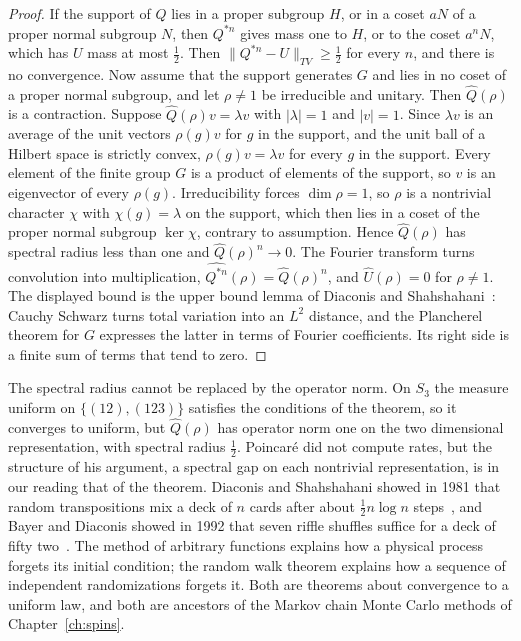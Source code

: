 \begin{proof}
If the support of $Q$ lies in a proper subgroup $H$, or in a coset $aN$ of a proper normal subgroup $N$, then $Q^{*n}$ gives mass one to $H$, or to the coset $a^nN$, which has $U$ mass at most $\frac12$. Then $\|Q^{*n}-U\|_{TV}\geq\frac12$ for every $n$, and there is no convergence. Now assume that the support generates $G$ and lies in no coset of a proper normal subgroup, and let $\rho\neq1$ be irreducible and unitary. Then $\hat Q(\rho)$ is a contraction. Suppose $\hat Q(\rho)v = \lambda v$ with $|\lambda| = 1$ and $|v| = 1$. Since $\lambda v$ is an average of the unit vectors $\rho(g)v$ for $g$ in the support, and the unit ball of a Hilbert space is strictly convex, $\rho(g)v = \lambda v$ for every $g$ in the support. Every element of the finite group $G$ is a product of elements of the support, so $v$ is an eigenvector of every $\rho(g)$. Irreducibility forces $\dim\rho = 1$, so $\rho$ is a nontrivial character $\chi$ with $\chi(g) = \lambda$ on the support, which then lies in a coset of the proper normal subgroup $\ker\chi$, contrary to assumption. Hence $\hat Q(\rho)$ has spectral radius less than one and $\hat Q(\rho)^n\to0$. The Fourier transform turns convolution into multiplication, $\widehat{Q^{*n}}(\rho) = \hat Q(\rho)^n$, and $\hat U(\rho) = 0$ for $\rho\neq1$. The displayed bound is the upper bound lemma of Diaconis and Shahshahani~\cite{diaconisshahshahani1981,diaconis1988}: Cauchy Schwarz turns total variation into an $L^2$ distance, and the Plancherel theorem for $G$ expresses the latter in terms of Fourier coefficients. Its right side is a finite sum of terms that tend to zero.
\end{proof}

The spectral radius cannot be replaced by the operator norm. On $S_3$ the measure uniform on $\{(12),(123)\}$ satisfies the conditions of the theorem, so it converges to uniform, but $\hat Q(\rho)$ has operator norm one on the two dimensional representation, with spectral radius $\frac12$. Poincar\'e did not compute rates, but the structure of his argument, a spectral gap on each nontrivial representation, is in our reading that of the theorem. Diaconis and Shahshahani showed in 1981 that random transpositions mix a deck of $n$ cards after about $\frac12n\log n$ steps~\cite{diaconisshahshahani1981}, and Bayer and Diaconis showed in 1992 that seven riffle shuffles suffice for a deck of fifty two~\cite{bayerdiaconis1992}. The method of arbitrary functions explains how a physical process forgets its initial condition; the random walk theorem explains how a sequence of independent randomizations forgets it. Both are theorems about convergence to a uniform law, and both are ancestors of the Markov chain Monte Carlo methods of Chapter~\ref{ch:spins}.

